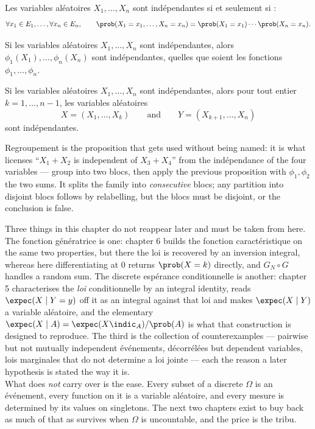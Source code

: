 \begin{prop}
  Les variables aléatoires $X_{1}, \dots, X_{n}$ sont indépendantes si et
  seulement si :
  \[ \forall x_{1} \in E_{1}, \dots, \forall x_{n} \in E_{n}, \qquad
     \prob(X_{1} = x_{1}, \dots, X_{n} = x_{n})
       = \prob(X_{1} = x_{1}) \cdots \prob(X_{n} = x_{n}). \]
\end{prop}

\begin{prop}
  Si les variables aléatoires $X_{1}, \dots, X_{n}$ sont indépendantes, alors
  $\phi_{1}(X_{1}), \dots, \phi_{n}(X_{n})$ sont indépendantes, quelles que
  soient les fonctions $\phi_{1}, \dots, \phi_{n}$.
\end{prop}

\begin{prop}
  Si les variables aléatoires $X_{1}, \dots, X_{n}$ sont indépendantes, alors
  pour tout entier $k = 1, \dots, n-1$, les variables aléatoires
  \[ X = (X_{1}, \dots, X_{k}) \qquad \text{and} \qquad
     Y = (X_{k+1}, \dots, X_{n}) \]
  sont indépendantes.
\end{prop}

\begin{remark}
  Regroupement is the proposition that gets used without being named: it is
  what licenses ``$X_{1} + X_{2}$ is independent of $X_{3} + X_{4}$'' from the
  indépendance of the four variables --- group into two blocs, then apply the
  previous proposition with $\phi_{1}, \phi_{2}$ the two sums. It splits the
  family into \emph{consecutive} blocs; any partition into disjoint blocs
  follows by relabelling, but the blocs must be disjoint, or the conclusion is
  false.
\end{remark}

\begin{conclusion}
  Three things in this chapter do not reappear later and must be taken from here.
  The fonction génératrice is one: chapter 6 builds the fonction caractéristique
  on the same two properties, but there the loi is recovered by an inversion
  integral, whereas here differentiating at $0$ returns
  $\prob(X = k)$ directly, and $G_{N} \circ G$ handles a random sum. The discrete
  espérance conditionnelle is another: chapter 5 characterises the \emph{loi}
  conditionnelle by an integral identity, reads $\expec(X \mid Y = y)$ off it
  as an integral against that loi and makes $\expec(X \mid Y)$ a variable
  aléatoire, and the elementary
  $\expec(X \mid A) = \expec(X\indic_{A})/\prob(A)$ is what that construction is
  designed to reproduce. The third is the collection of counterexamples ---
  pairwise but not mutually independent événements, décorrélées but dependent
  variables, lois marginales that do not determine a loi jointe --- each the
  reason a later hypothesis is stated the way it is.\\

  What does \emph{not} carry over is the ease. Every subset of a discrete
  $\Omega$ is an événement, every function on it is a variable aléatoire, and
  every mesure is determined by its values on singletons. The next two chapters
  exist to buy back as much of that as survives when $\Omega$ is uncountable, and the
  price is the tribu.
\end{conclusion}

